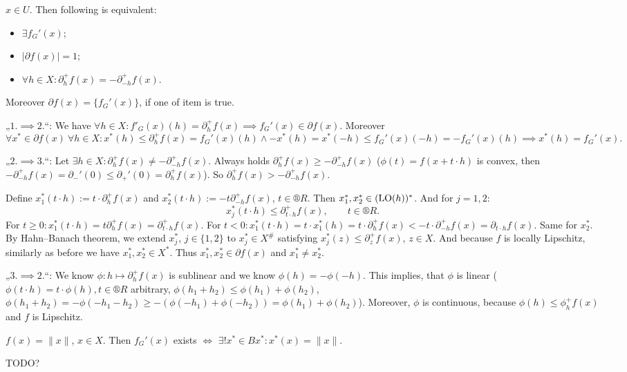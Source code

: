 \documentclass[12pt]{article}					%
\begin{document}
\begin{tvrzeni}
	$x \in U$. Then following is equivalent:

	\begin{itemize}
		\item $\exists f_G'(x)$;
		\item $|\partial f(x)| = 1$;
		\item $\forall h \in X: \partial_h^+ f(x) = -\partial_{-h}^+ f(x)$.
	\end{itemize}

	Moreover $\partial f(x) = \{f_G'(x)\}$, if one of item is true.

	\begin{dukazin}
		„$1. \implies 2.$“: We have $\forall h \in X: f'_G(x)(h) = \partial_h^+ f(x) \implies f_G'(x) \in \partial f(x)$. Moreover
		$$ \forall x^* \in \partial f(x)\ \forall h \in X: x^*(h) ≤ \partial_h^+ f(x) = f_G'(x)(h) \land -x^*(h) = x^*(-h) ≤ f_G'(x)(-h) = -f_G'(x)(h) \implies x^*(h) = f_G'(x). $$

		„$2. \implies 3.$“: Let $\exists h \in X: \partial_h^+ f(x) ≠ -\partial_{-h}^+ f(x)$. Always holds $\partial_h^+ f(x) ≥ -\partial_{-h}^+ f(x)$ ($\phi(t) = f(x + t·h)$ is convex, then $-\partial_{-h}^+ f(x) = \partial_-'(0) ≤ \partial_+'(0) = \partial_h^+ f(x)$). So $\partial_h^+ f(x) > -\partial_{-h}^+ f(x)$.

		Define $x_1^*(t·h) := t·\partial_h^+ f(x)$ and $x_2^*(t·h) := - t \partial_{-h}^+ f(x)$, $t \in ®R$. Then $x_1^*, x_2^* \in (\operatorname{LO}(h))^*$. And for $j = 1, 2$:
		$$ x_j^*(t·h) ≤ \partial_{t·h}^+ f(x), \qquad t \in ®R. $$
		For $t ≥ 0: x_1^*(t·h) = t \partial_h^+ f(x) = \partial_{t·h}^+ f(x)$. For $t < 0: x_1^*(t·h) = t·x_1^*(h) = t·\partial_h^+f(x) < -t·\partial_{-h}^+ f(x) = \partial_{t·h} f(x)$. Same for $x_2^*$. By Hahn–Banach theorem, we extend $x_j^*$, $j \in \{1, 2\}$ to $x_j^* \in X^{\#}$ satisfying $x_j^*(z) ≤ \partial_z^+ f(x)$, $z \in X$. And because $f$ is locally Lipschitz, similarly as before we have $x_1^*, x_2^* \in X^*$. Thus $x_1^*, x_2^* \in \partial f(x)$ and $x_1^* ≠ x_2^*$.

		„$3. \implies 2.$“: We know $\phi: h \mapsto \partial_h^+ f(x)$ is sublinear and we know $\phi(h) = -\phi(-h)$. This implies, that $\phi$ is linear ($\phi(t·h) = t·\phi(h), t \in ®R$ arbitrary, $\phi(h_1 + h_2) ≤ \phi(h_1) + \phi(h_2)$, $\phi(h_1 + h_2) = -\phi(-h_1 - h_2) ≥ -(\phi(-h_1) + \phi(-h_2)) = \phi(h_1) + \phi(h_2)$). Moreover, $\phi$ is continuous, because $\phi(h) ≤ \phi_h^+ f(x)$ and $f$ is Lipschitz.
	\end{dukazin}
\end{tvrzeni}

\begin{dusledek}
	$f(x) = \|x\|$, $x \in X$. Then $f_G'(x)$ exists $\Leftrightarrow$ $\exists! x^* \in B x^*: x^*(x) = \|x\|$.
\end{dusledek}

TODO? %
\end{document}
